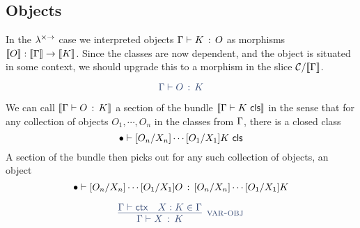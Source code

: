 \begin{multicols}{2}


\end{multicols}

\subsection{Objects}

In the $\lambda^{\times \to}$ case we interpreted objects
$\Gamma \vdash K \, : \, O$ as morphisms $\llbracket O \rrbracket : \llbracket \Gamma \rrbracket \to \llbracket K \rrbracket$.
Since the classes are now dependent,
and the object is situated in some context,
we should upgrade this to a morphism in the slice $\mathcal{C} / \llbracket \Gamma \rrbracket$.

\begin{multicols}{2}

    \[\color{syntax}\ObjJdg{\Ga}{O}{K}\]


\end{multicols}

We can call $\llbracket \Gamma \vdash O \, : \, K \rrbracket$
a section of the bundle $\llbracket \Gamma \vdash K \,\, \mathsf{cls} \rrbracket$
in the sense that for any collection of objects $O_{1},\cdots,O_{n}$ in the classes from $\Gamma$,
there is a closed class \[\bullet \vdash [O_{n}/X_{n}] \cdots [O_{1} / X_{1}] K \,\, \mathsf{cls}\]
A section of the bundle then picks out for any such collection of objects,
an object \[\bullet \vdash [O_{n}/X_{n}] \cdots [O_{1} / X_{1}] O \, : \, [O_{n}/X_{n}] \cdots [O_{1} / X_{1}] K\]
\begin{multicols}{2}

    \[\color{syntax}  \infer[\textsc{var-obj}]{\ObjJdg{\Ga}{X}{K}}
    {\CtxJdg{\Ga} & X:K \in \Ga}\]


\end{multicols}

